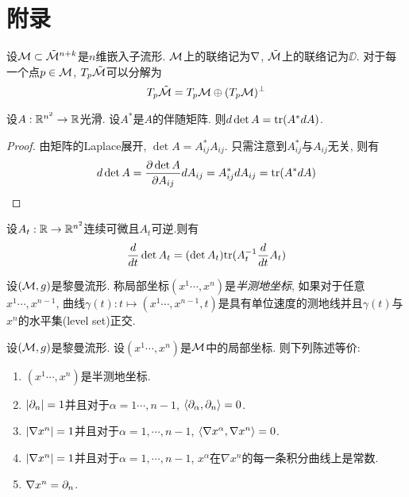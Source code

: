 \appendix
\appendix
\chapter{附录}

设$\M\subset \MM^{n+k}$是$n$维嵌入子流形. $\M$上的联络记为$\D$, $\MM$上的联络记为$\DD$. 对于每一个点$p \in \M$, $T_p\MM$可以分解为
\begin{equation}
    T_p\MM=T_p\M \oplus  (T_p\M)^\T
\end{equation}
\begin{lemma}
    设$A: \R^{n^2} \to \R$光滑. 设$A^*$是$A$的伴随矩阵. 则$d\det A=\tr(A^*dA)$.
\end{lemma}
\begin{proof}
    由矩阵的Laplace展开, $\det A=A^*_{ij}A_{ij}$. 只需注意到$A^*_{ij}$与$A_{ij}$无关, 则有
    \begin{equation}
        d\det A= \frac{\P \det A}{\P A_{ij}}dA_{ij}=A^*_{ij}dA_{ij}=\tr(A^*dA)
    \end{equation}
\end{proof}
\begin{corollary}
    设$A_t: \R \to \R^{n^2}$连续可微且$A_t$可逆.则有
    \begin{equation}
        \frac{d}{dt}\det A_t=(\det A_t)\tr(A^{-1}_t\frac{d}{dt}A_t)
    \end{equation}
\end{corollary}
\begin{definition}
    设$(\M,g)$是黎曼流形.  称局部坐标$(x^1\cdots, x^n)$是\textit{半测地坐标}, 如果对于任意$x^1\cdots, x^{n-1}$, 曲线$\gamma(t): t \mapsto (x^1\cdots,x^{n-1},t)$是具有单位速度的测地线并且$\gamma(t)$与$x^n$的水平集(level set)正交.
\end{definition}
\begin{lemma}
    设$(\M,g)$是黎曼流形.  设$(x^1\cdots, x^n)$是$\M$中的局部坐标. 则下列陈述等价:
    \begin{enumerate}
        \item $(x^1\cdots, x^n)$是半测地坐标.
        \item $\abs{\P_n}=1$并且对于$\alpha=1\cdots,n-1$, $\inner{\P_\alpha}{\P_n}=0$.
        \item $\abs{\nabla x^n}=1$并且对于$\alpha=1,\cdots,n-1$, $\inner{\nabla x^\alpha}{\nabla x^n}=0$.
        \item $\abs{\nabla x^n}=1$并且对于$\alpha=1,\cdots,n-1$, $x^\alpha$在$\nabla x^n$的每一条积分曲线上是常数.
        \item $\nabla x^n=\P_n$.
    \end{enumerate}
\end{lemma}


